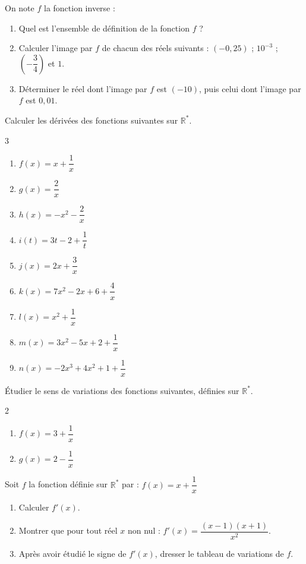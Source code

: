 \documentclass[french]{book}
\begin{document}
\begin{exocor}
On note  $f$ la fonction inverse :
\begin{enumerate}
	\item Quel est l'ensemble de définition de la fonction $f$ ?
	\item Calculer l'image par $f$ de chacun des réels suivants : $(- 0,25)$ ; $10^{-3}$ ; $\left(-\dfrac{3}{4}\right)$  et $1$.
	\item Déterminer le réel dont l'image par $f$ est $(-10)$, puis celui dont l'image par $f$ est $0,01$.
\end{enumerate}
\end{exocor}


\begin{exocor}
Calculer les dérivées des fonctions suivantes sur $\mathbb{R}^*$.

\begin{multicols}{3}
\begin{enumerate}
\item $f(x)= x+\dfrac{1}{x}$
\item $g(x)=\dfrac{2}{x}$
\item $h(x)=-x^2-\dfrac{2}{x}$
\item $i(t)=3t-2+\dfrac{1}{t}$
\item $j(x)=2x+\dfrac{3}{x}$
\item $k(x)=7x^2-2x+6+\dfrac{4}{x}$
\item $l(x)=x^2 + \dfrac{1}{x}$
\item $m(x)=3x^2-5x+2+\dfrac{1}{x}$
\item $n(x)=-2x^3+4x^2+1+\dfrac{1}{x}$
\end{enumerate}
\end{multicols}
\end{exocor}

\begin{exocor}
Étudier le sens de variations des fonctions suivantes, définies sur $\mathbb{R}^*$.

\begin{multicols}{2}
\begin{enumerate}
\item $f(x)=3+\dfrac{1}{x}$
\item $g(x)=2-\dfrac{1}{x}$
\end{enumerate}
\end{multicols}
\end{exocor}


\begin{exocor}
Soit $f$ la fonction définie sur $\mathbb{R}^*$ par : $f(x)=x+\dfrac{1}{x}$

\begin{enumerate}
\item Calculer $f'(x)$.
\item Montrer que pour tout réel $x$ non nul : $f'(x)=\dfrac{(x-1)(x+1)}{x^2}$.
\item Après avoir étudié le signe de $f'(x)$, dresser le tableau de variations de $f$.
\end{enumerate}
\end{exocor}
\end{document}
